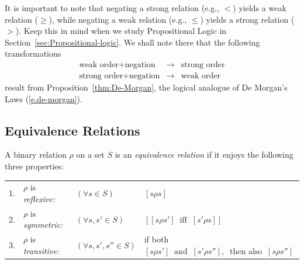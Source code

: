 \medskip

It is important to note that negating a strong relation (e.g., $<$) yields a weak relation ($\geq$), while negating a weak relation (e.g., $\leq$) yields a strong relation ($>$).  Keep this in mind when we study Propositional Logic in Section~\ref{sec:Propositional-logic}.  We shall note there that the following transformations
\begin{eqnarray*}
\mbox{weak order} + \mbox{negation} 
 & \longrightarrow & \mbox{strong order} \\
\mbox{strong order} + \mbox{negation}
 & \longrightarrow & \mbox{weak order}
\end{eqnarray*}
result from Proposition~\ref{thm:De-Morgan}, the logical analogue of De Morgan's Laws (\ref{e.de-morgan}).

\subsection{Equivalence Relations}
\label{sec:equiv-relation}

  

A binary relation $\rho$ on a set $S$ is an {\it equivalence relation} if it enjoys the following three properties:

\medskip

\begin{tabular}{llll}
1. &
$\rho$ is {\em reflexive:}
   & $(\forall s \in S)$ & $[s \rho s]$ \\
2. &
$\rho$ is {\em symmetric:}
   & $(\forall s, s' \in S)$ 
& $\left[ [s \rho s'] \ \mbox{ iff } \ [s' \rho s] \right]$ \\
3. &
$\rho$ is {\em transitive:}
   & $(\forall s, s', s'' \in S)$ & if both \
$[s \rho s'] \ \mbox{ and } \ [s' \rho s''], \ \mbox{ then also } \ [s \rho s'']$
\end{tabular}

\medskip

